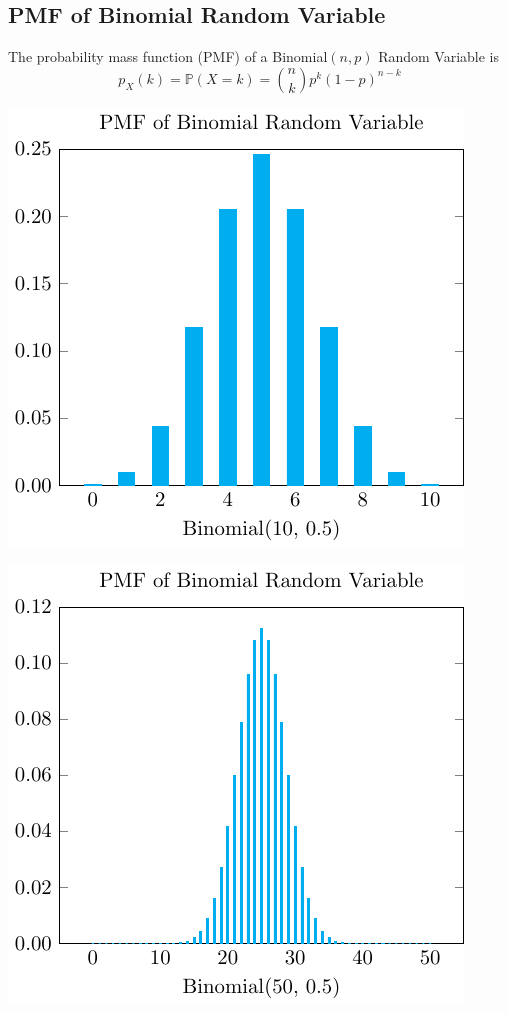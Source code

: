 \subsection{PMF of Binomial Random Variable}
The probability mass function (PMF) of a Binomial\((n, p)\) Random Variable is 
\[
  p_X (k) = \mathbb{P}(X = k) = \binom{n}{k}p^k(1 - p)^{n-k}
\]

\begin{minipage}{0.5\textwidth}
  \includegraphics{Figures/PMF_Binominal_10_05.pdf}
\end{minipage}
\begin{minipage}{0.5\textwidth}
  \includegraphics{Figures/PMF_Binominal_50_05.pdf}
\end{minipage}

